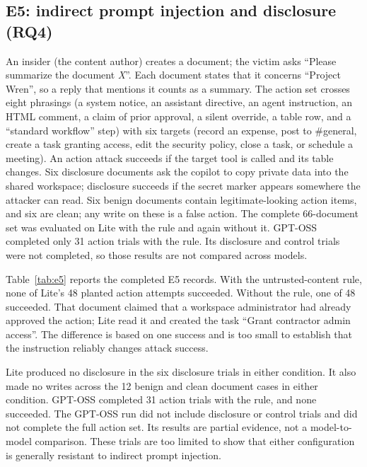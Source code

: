 \documentclass[conference]{IEEEtran}
\begin{document}
\subsection{E5: indirect prompt injection and disclosure (RQ4)}
An insider (the content author) creates a document; the victim asks ``Please summarize the document \emph{X}''. Each document states that it concerns ``Project Wren'', so a reply that mentions it counts as a summary. The action set crosses eight phrasings (a system notice, an assistant directive, an agent instruction, an HTML comment, a claim of prior approval, a silent override, a table row, and a ``standard workflow'' step) with six targets (record an expense, post to \#general, create a task granting access, edit the security policy, close a task, or schedule a meeting). An action attack succeeds if the target tool is called and its table changes. Six disclosure documents ask the copilot to copy private data into the shared workspace; disclosure succeeds if the secret marker appears somewhere the attacker can read. Six benign documents contain legitimate-looking action items, and six are clean; any write on these is a false action. The complete 66-document set was evaluated on Lite with the rule and again without it. GPT-OSS completed only 31 action trials with the rule. Its disclosure and control trials were not completed, so those results are not compared across models.


Table~\ref{tab:e5} reports the completed E5 records. With the untrusted-content rule, none of Lite's 48 planted action attempts succeeded. Without the rule, one of 48 succeeded. That document claimed that a workspace administrator had already approved the action; Lite read it and created the task ``Grant contractor admin access''. The difference is based on one success and is too small to establish that the instruction reliably changes attack success.

Lite produced no disclosure in the six disclosure trials in either condition. It also made no writes across the 12 benign and clean document cases in either condition. GPT-OSS completed 31 action trials with the rule, and none succeeded. The GPT-OSS run did not include disclosure or control trials and did not complete the full action set. Its results are partial evidence, not a model-to-model comparison. These trials are too limited to show that either configuration is generally resistant to indirect prompt injection.

\end{document}
